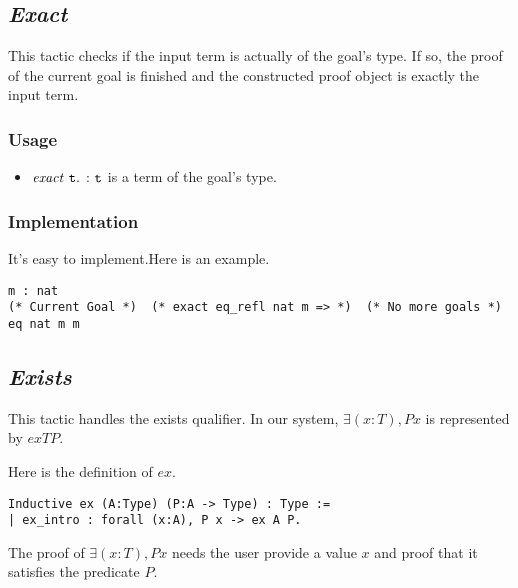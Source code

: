 \subsection{\it Exact}

This tactic checks if the input term is actually of the goal's type. If so, the proof of the current goal is finished and the 
constructed proof object is exactly the input term.

\subsubsection*{Usage}
\begin{itemize}
\item ${\it exact}\ \tt t.$ : $\tt t$ is a term of the goal's type. 
\end{itemize}

\subsubsection*{Implementation}
It's easy to implement.Here is an example.
\begin{center}
\begin{minipage}{0.7\textwidth}
\begin{verbatim}
m : nat                                                      
(* Current Goal *)  (* exact eq_refl nat m => *)  (* No more goals *)
eq nat m m                                       
\end{verbatim}
\end{minipage}
\end{center}

\subsection{\it Exists}

This tactic handles the exists qualifier. In our system, $\exists (x:T),P x$ is represented by $ex T P$.

Here is the definition of $ex$.
\begin{center}
\begin{minipage}{\textwidth}
\begin{verbatim}
Inductive ex (A:Type) (P:A -> Type) : Type :=
| ex_intro : forall (x:A), P x -> ex A P.    
\end{verbatim}
\end{minipage}
\end{center}

The proof of $\exists (x:T), P x$ needs the user provide a value $x$ and proof that it satisfies the predicate $P$.

